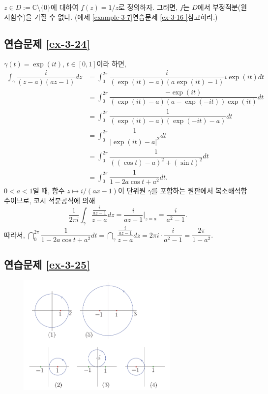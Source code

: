 $z\in D:= \mathbb C\setminus\{0\}$에 대하여 $f(z) = 1/z$로 정의하자.
그러면, $f$는 $D$에서 부정적분(원시함수)을 가질 수 없다.
(예제 \ref{example-3-7}\과 연습문제 \ref{ex-3-16 }\을 참고하라.)

\subsection*{연습문제 \ref{ex-3-24}}

$\gamma(t) = \exp(it)$, $t\in[0,1]$이라 하면,
\begin{align*}
\int_\gamma \dfrac i{(z-a)(az-1)}dz 
&= \int_0^{2\pi} \dfrac{i}{(\exp(it) -a)(a\exp(it)-1)}i\exp(it)dt \\
&= \int_0^{2\pi} \dfrac{-\exp(it)}{(\exp(it) -a)(a-\exp(-it))\exp(it)}dt \\
&= \int_0^{2\pi} \dfrac{1}{(\exp(it) -a)(\exp(-it)-a)}dt \\
&= \int_0^{2\pi} \dfrac1{|\exp(it)-a|^2}dt \\
&= \int_0^{2\pi} \dfrac1{((\cos t)-a)^2 + (\sin t)^2}dt \\
&= \int_0^{2\pi} \dfrac1{1-2a\cos t + a^2}dt.
\end{align*}
$0<a<1$일 때,
함수 $z\mapsto i/(ax-1)$이 단위원 $\gamma$를 포함하는 원판에서 복소해석함수이므로,
코시 적분공식에 의해
\[
\dfrac1{2\pi i} \int_\gamma \dfrac{\frac{i}{az-1}}{z-a}dz = \dfrac{i}{az-1}\Big|_{z=a}
= \dfrac i{a^2-1}.
\]
따라서,
$\dint_0^{2\pi} \dfrac 1{1-2a\cos t +a^2}dt
= \dint_\gamma \dfrac{\frac{i}{az-1}}{z-a}dz 
= 2\pi i \cdot \dfrac i{a^2-1} = \dfrac{2\pi}{1-a^2}$.

\subsection*{연습문제 \ref{ex-3-25}}

\begin{figure}[h!]
\begin{center}
\includegraphics[width=0.7\textwidth]{./Solution/figs/fig-s-0-11}
\end{center}
\end{figure}


